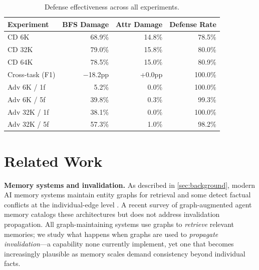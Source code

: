 \documentclass[11pt]{article}
\begin{document}
\begin{table}[htbp]
\centering
\small
\begin{tabular}{lrrr}
\toprule
\textbf{Experiment} & \textbf{BFS Damage} & \textbf{Attr Damage} & \textbf{Defense Rate} \\
\midrule
CD 6K & 68.9\% & 14.8\% & 78.5\% \\
CD 32K & 79.0\% & 15.8\% & 80.0\% \\
CD 64K & 78.5\% & 15.0\% & 80.9\% \\
Cross-task (F1) & $-$18.2pp & +0.0pp & 100.0\% \\
Adv 6K / 1f & 5.2\% & 0.0\% & 100.0\% \\
Adv 6K / 5f & 39.8\% & 0.3\% & 99.3\% \\
Adv 32K / 1f & 38.1\% & 0.0\% & 100.0\% \\
Adv 32K / 5f & 57.3\% & 1.0\% & 98.2\% \\
\bottomrule
\end{tabular}
\caption{Defense effectiveness across all experiments.}
\label{tab:defense_all}
\end{table}


\section{Related Work}
\label{sec:related}

\textbf{Memory systems and invalidation.}
As described in \cref{sec:background}, modern AI memory systems maintain entity graphs for retrieval \citep{mem0_2024, magma_2026, amem_2025, zep_2025} and some detect factual conflicts at the individual-edge level \citep{mem0_2024, zep_2025}.
A recent survey of graph-augmented agent memory \citep{graph_agent_memory_survey_2026} catalogs these architectures but does not address invalidation propagation.
All graph-maintaining systems use graphs to \textit{retrieve} relevant memories; we study what happens when graphs are used to \textit{propagate invalidation}---a capability none currently implement, yet one that becomes increasingly plausible as memory scales demand consistency beyond individual facts.
\end{document}
